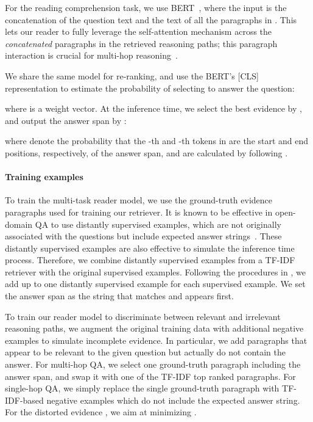 \documentclass{article} \usepackage{iclr2020_conference,times}
\begin{document}
For the reading comprehension task, we use BERT~\citep{devlin2018bert}, where the input is the concatenation of the question text and the text of all the paragraphs in .
This lets our reader to fully leverage the self-attention mechanism across the {\it concatenated} paragraphs in the retrieved reasoning paths; this paragraph interaction is crucial for multi-hop reasoning~\citep{wang-etal-2019-multi-hop}.



We share the same model for re-ranking, and use the BERT's [CLS] representation to estimate the probability of selecting  to answer the question:

where  is a weight vector.
At the inference time, we select the best evidence  by , and output the answer span by :

where  denote the probability that the -th and -th tokens in  are the start and end positions, respectively, of the answer span,
and are calculated by following \citet{devlin2018bert}.



\vspace{-2mm}\paragraph{Training examples}
To train the multi-task reader model, we use the ground-truth evidence paragraphs used for training our retriever. 
It is known to be effective in open-domain QA to use distantly supervised examples, which are not originally associated with the questions but include expected answer strings~\citep{chen2017reading,wang2018r,hu2019retrieve}.
These distantly supervised examples are also effective to simulate the inference time process. 
Therefore, we combine distantly supervised examples from a TF-IDF retriever with the original supervised examples. 
Following the procedures in \cite{chen2017reading}, we add up to one distantly supervised example for each supervised example. 
We set the answer span as the string that matches  and appears first.

To train our reader model to discriminate between relevant and irrelevant reasoning paths, we augment the original training data with additional negative examples to simulate incomplete evidence.
In particular, we add paragraphs that appear to be relevant to the given question but actually do not contain the answer.
For multi-hop QA, we select one ground-truth paragraph including the answer span, and swap it with one of the TF-IDF top ranked paragraphs.
For single-hop QA, we simply replace the single ground-truth paragraph with TF-IDF-based negative examples which do not include the expected answer string. 
For the distorted evidence , we aim at minimizing .
\end{document}
